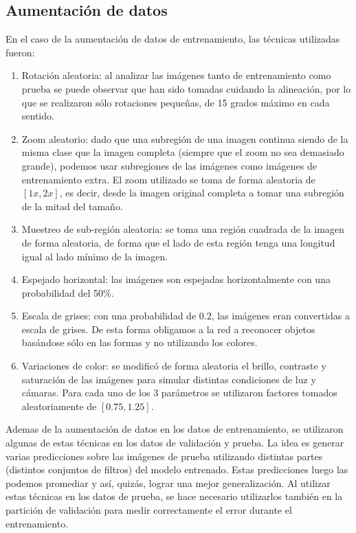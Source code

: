 \documentclass[a4article]{article}
\begin{document}
\subsection{Aumentación de datos}
En el caso de la aumentación de datos de entrenamiento, las técnicas utilizadas fueron:

\begin{enumerate}
	\item Rotación aleatoria: al analizar las imágenes tanto de entrenamiento como prueba se puede observar que han
		sido tomadas cuidando la alineación, por lo que se realizaron sólo rotaciones pequeñas, de 15 grados
		máximo en cada sentido.
	\item Zoom aleatorio: dado que una subregión de una imagen continua siendo de la misma clase que la imagen
		completa (siempre que el zoom no sea demasiado grande), podemos usar subregiones de las imágenes como
		imágenes de entrenamiento extra. El zoom utilizado se toma de forma aleatoria de
		$\left[1x, 2x\right]$, es decir, desde la imagen original completa a tomar una subregión de la mitad del tamaño.
	\item Muestreo de sub-región aleatoria: se toma una región cuadrada de la imagen de forma aleatoria, de forma que el lado de
		esta región tenga una longitud igual al lado mínimo de la imagen.
	\item Espejado horizontal: las imágenes son espejadas horizontalmente con una probabilidad del 50\%.
	\item Escala de grises: con una probabilidad de 0.2, las imágenes eran convertidas a escala de grises. De esta
		forma obligamos a la red a reconocer objetos basándose sólo en las formas y no utilizando los colores.
	\item Variaciones de color: se modificó de forma aleatoria el brillo, contraste y saturación de las imágenes
		para simular distintas condiciones de luz y cámaras. Para cada uno de los 3 parámetros se utilizaron
		factores tomados aleatoriamente de $\left[0.75, 1.25\right]$.
\end{enumerate}

Ademas de la aumentación de datos en los datos de entrenamiento, se utilizaron algunas de estas técnicas en los datos de
validación y prueba. La idea es generar varias predicciones sobre las imágenes de prueba utilizando distintas partes
(distintos conjuntos de filtros) del modelo entrenado. Estas predicciones luego las podemos promediar y así, quizás, lograr
una mejor generalización. Al utilizar estas técnicas en los datos de prueba, se hace necesario utilizarlos también en la
partición de validación para medir correctamente el error durante el entrenamiento.
\end{document}
